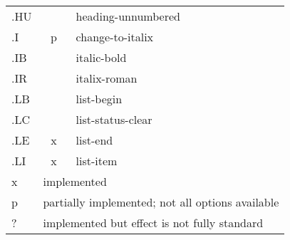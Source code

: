 \begin{center}
\begin{tabular}{|l|c|l|}
.HU&	&		heading-unnumbered\\
.I&	p&		change-to-italix\\
.IB&	&		italic-bold\\
.IR&	&		italix-roman\\
.LB&	&		list-begin\\
.LC&	&		list-status-clear\\
.LE&	x&		list-end\\
.LI&	x&		list-item\\
\hline\hline
x&\multicolumn{2}{|l|}{implemented}\\
p&\multicolumn{2}{|l|}{partially implemented; not all options available}\\
?&\multicolumn{2}{|l|}{implemented but effect is not fully standard}\\
\hline
\end{tabular}
\end{center}
\medskip
